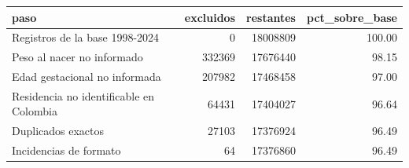 \begin{tabular}{lrrr}
\toprule
paso & excluidos & restantes & pct\_sobre\_base \\
\midrule
Registros de la base 1998-2024 & 0 & 18008809 & 100.00 \\
Peso al nacer no informado & 332369 & 17676440 & 98.15 \\
Edad gestacional no informada & 207982 & 17468458 & 97.00 \\
Residencia no identificable en Colombia & 64431 & 17404027 & 96.64 \\
Duplicados exactos & 27103 & 17376924 & 96.49 \\
Incidencias de formato & 64 & 17376860 & 96.49 \\
\bottomrule
\end{tabular}
